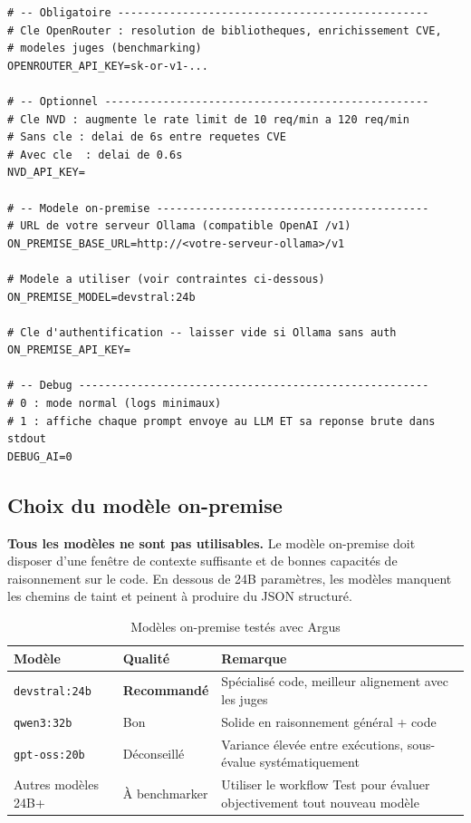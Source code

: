 \documentclass[a4paper, 12pt, hidelinks]{article}
\begin{document}
\begin{lstlisting}[caption={backend/.env -- configuration complete}]
# -- Obligatoire ------------------------------------------------
# Cle OpenRouter : resolution de bibliotheques, enrichissement CVE,
# modeles juges (benchmarking)
OPENROUTER_API_KEY=sk-or-v1-...

# -- Optionnel --------------------------------------------------
# Cle NVD : augmente le rate limit de 10 req/min a 120 req/min
# Sans cle : delai de 6s entre requetes CVE
# Avec cle  : delai de 0.6s
NVD_API_KEY=

# -- Modele on-premise ------------------------------------------
# URL de votre serveur Ollama (compatible OpenAI /v1)
ON_PREMISE_BASE_URL=http://<votre-serveur-ollama>/v1

# Modele a utiliser (voir contraintes ci-dessous)
ON_PREMISE_MODEL=devstral:24b

# Cle d'authentification -- laisser vide si Ollama sans auth
ON_PREMISE_API_KEY=

# -- Debug ------------------------------------------------------
# 0 : mode normal (logs minimaux)
# 1 : affiche chaque prompt envoye au LLM ET sa reponse brute dans stdout
DEBUG_AI=0
\end{lstlisting}

\subsection*{Choix du modèle on-premise}
\label{sec:modele}

\textbf{Tous les modèles ne sont pas utilisables.} Le modèle on-premise doit disposer d'une fenêtre de contexte suffisante et de bonnes capacités de raisonnement sur le code. En dessous de 24B paramètres, les modèles manquent les chemins de taint et peinent à produire du JSON structuré.

\begin{table}[H]
  \centering
  \begin{tabularx}{\textwidth}{l l X}
    \toprule
    \textbf{Modèle} & \textbf{Qualité} & \textbf{Remarque} \\
    \midrule
    \texttt{devstral:24b} & \textbf{Recommandé} & Spécialisé code, meilleur alignement avec les juges \\
    \texttt{qwen3:32b}    & Bon                 & Solide en raisonnement général + code \\
    \texttt{gpt-oss:20b}  & Déconseillé         & Variance élevée entre exécutions, sous-évalue systématiquement \\
    Autres modèles 24B+   & À benchmarker       & Utiliser le workflow Test pour évaluer objectivement tout nouveau modèle \\
    \bottomrule
  \end{tabularx}
  \caption{Modèles on-premise testés avec Argus}
\end{table}
\end{document}

